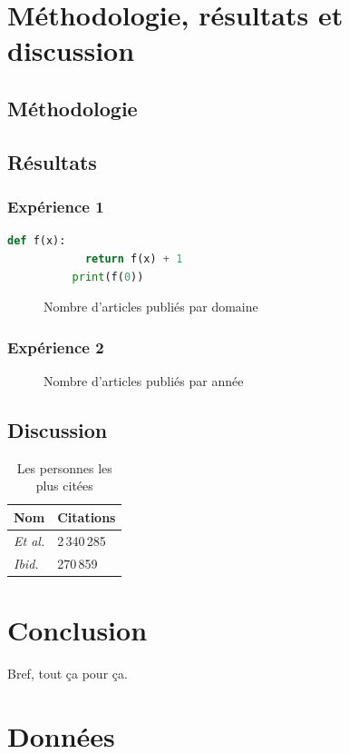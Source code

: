\documentclass[phd]{dissertum}
\begin{document}
  \chapter{Méthodologie, résultats et discussion}
    \lipsum[1]
    \section{Méthodologie}
      \lipsum[2]
    \section{Résultats}
      \lipsum[3]
      \subsection{Expérience 1}
        \lipsum[4]
        \begin{lstlisting}[language=Python, caption=Script très long à exécuter, label=lst:fonction]
          def f(x):
            return f(x) + 1
          print(f(0))
        \end{lstlisting}
        \begin{figure}
          \centering
          \caption{Nombre d'articles publiés par domaine}
        \end{figure}
      \subsection{Expérience 2}
        \lipsum[5]
        \begin{figure}
          \centering
          \caption{Nombre d'articles publiés par année}
        \end{figure}
    \section{Discussion}
      \lipsum[6]
      \begin{table}
        \centering
        \begin{tabular}{ll}
          \toprule
          \bf Nom & \bf Citations \\
          \midrule
          \emph{Et al.} & 2\,340\,285 \\
          \emph{Ibid.} & 270\,859 \\ 
          \bottomrule
        \end{tabular}
        \caption{Les personnes les plus citées}
      \end{table}

  \chapter{Conclusion}
    Bref, tout ça pour ça.

  
  \printbibliography[heading=bibintoc]
  
  \appendix
  \chapter{Données}
    \lipsum[8-10]
\end{document}
